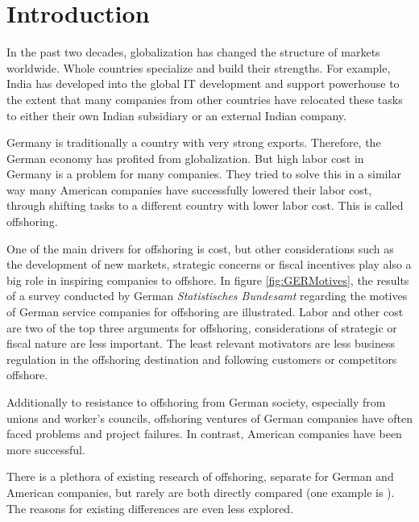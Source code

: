 \section{Introduction}
In the past two decades, globalization has changed the structure of markets worldwide. Whole countries specialize and build their strengths. For example, India has developed into the global IT development and support powerhouse to the extent that many companies from other countries have relocated these tasks to either their own Indian subsidiary or an external Indian company.

Germany is traditionally a country with very strong exports. Therefore, the German economy has profited from globalization. But high labor cost in Germany is a problem for many companies. They tried to solve this in a similar way many American companies have successfully lowered their labor cost, through shifting tasks to a different country with lower labor cost. This is called offshoring.

One of the main drivers for offshoring is cost, but other considerations such as the development of new markets, strategic concerns or fiscal incentives play also a big role in inspiring companies to offshore. In figure \ref{fig:GERMotives}, the results of a survey conducted by German \textit{Statistisches Bundesamt} regarding the motives of German service companies for offshoring are illustrated. Labor and other cost are two of the top three arguments for offshoring, considerations of strategic or fiscal nature are less important. The least relevant motivators are less business regulation in the offshoring destination and following customers or competitors offshore.

\vspace{5mm}



Additionally to resistance to offshoring from German society, especially from unions and worker's councils, offshoring ventures of German companies have often faced  problems and project failures. In contrast, American companies have been more successful.

There is a plethora of existing research of offshoring, separate for German and American companies, but rarely are both directly compared (one example is \cite{Hutzschenreuter.2007}). The reasons for existing differences are even less explored.


